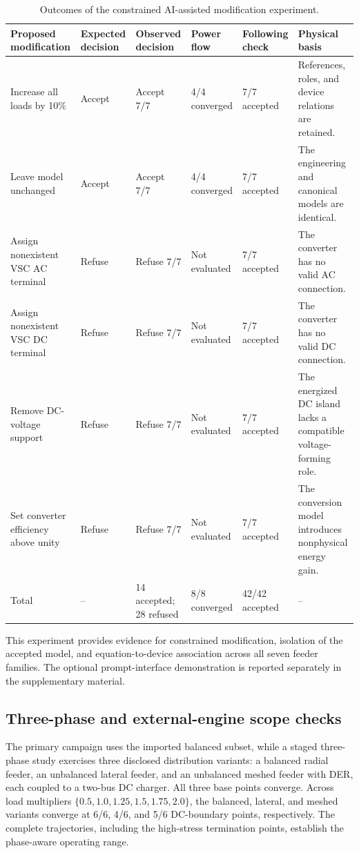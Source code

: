 \begin{table}[t]
\centering
\caption{Outcomes of the constrained AI-assisted modification experiment.}
\label{tab:ai-modifications}
\footnotesize
\begin{tabularx}{\textwidth}{@{}p{}p{}p{}p{}p{}X@{}}
\toprule
Proposed modification & Expected decision & Observed decision & Power flow & Following check & Physical basis \\
\midrule
Increase all loads by 10\% & Accept & Accept 7/7 & 4/4 converged & 7/7 accepted & References, roles, and device relations are retained. \\
Leave model unchanged & Accept & Accept 7/7 & 4/4 converged & 7/7 accepted & The engineering and canonical models are identical. \\
Assign nonexistent VSC AC terminal & Refuse & Refuse 7/7 & Not evaluated & 7/7 accepted & The converter has no valid AC connection. \\
Assign nonexistent VSC DC terminal & Refuse & Refuse 7/7 & Not evaluated & 7/7 accepted & The converter has no valid DC connection. \\
Remove DC-voltage support & Refuse & Refuse 7/7 & Not evaluated & 7/7 accepted & The energized DC island lacks a compatible voltage-forming role. \\
Set converter efficiency above unity & Refuse & Refuse 7/7 & Not evaluated & 7/7 accepted & The conversion model introduces nonphysical energy gain. \\
\midrule
Total & -- & 14 accepted; 28 refused & 8/8 converged & 42/42 accepted & -- \\
\bottomrule
\end{tabularx}
\end{table}

This experiment provides evidence for constrained modification, isolation of
the accepted model, and equation-to-device association across all seven feeder
families. The optional prompt-interface demonstration is reported separately in
the supplementary material.

\subsection{Three-phase and external-engine scope checks}

The primary campaign uses the imported balanced subset, while a staged
three-phase study exercises three disclosed distribution
variants: a balanced radial feeder, an unbalanced lateral feeder, and an
unbalanced meshed feeder with DER, each coupled to a two-bus DC charger. All
three base points converge. Across load multipliers
$\{0.5,1.0,1.25,1.5,1.75,2.0\}$, the balanced, lateral, and meshed variants
converge at 6/6, 4/6, and 5/6 DC-boundary points, respectively. The complete
trajectories, including the high-stress termination points, establish the
phase-aware operating range.

